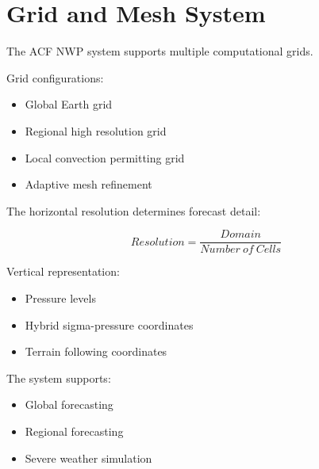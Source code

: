 \section{Grid and Mesh System}


The ACF NWP system supports multiple computational grids.



Grid configurations:


\begin{itemize}

\item Global Earth grid

\item Regional high resolution grid

\item Local convection permitting grid

\item Adaptive mesh refinement

\end{itemize}



The horizontal resolution determines forecast detail:


\[
Resolution=\frac{Domain}{Number\ of\ Cells}
\]



Vertical representation:


\begin{itemize}

\item Pressure levels

\item Hybrid sigma-pressure coordinates

\item Terrain following coordinates

\end{itemize}



The system supports:


\begin{itemize}

\item Global forecasting

\item Regional forecasting

\item Severe weather simulation

\end{itemize}

